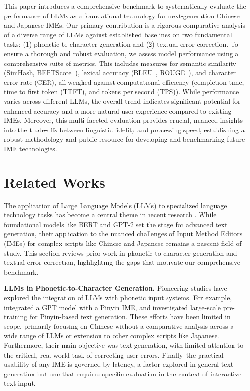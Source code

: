\documentclass[10pt, a4paper]{article}
\begin{document}
This paper introduces a comprehensive benchmark to systematically evaluate the performance of LLMs as a foundational technology for next-generation Chinese and Japanese IMEs. Our primary contribution is a rigorous comparative analysis of a diverse range of LLMs against established baselines on two fundamental tasks: (1) phonetic-to-character generation and (2) textual error correction. To ensure a thorough and robust evaluation, we assess model performance using a comprehensive suite of metrics. This includes measures for semantic similarity (SimHash, BERTScore~\citep{zhang2019bertscore}), lexical accuracy (BLEU~\citep{papineni2002bleu}, ROUGE~\citep{lin2004rouge}), and character error rate (CER), all weighed against computational efficiency (completion time, time to first token (TTFT), and tokens per second (TPS)). While performance varies across different LLMs, the overall trend indicates significant potential for enhanced accuracy and a more natural user experience compared to existing IMEs. Moreover, this multi-faceted evaluation provides crucial, nuanced insights into the trade-offs between linguistic fidelity and processing speed, establishing a robust methodology and public resource for developing and benchmarking future IME technologies.


\section{Related Works}

The application of Large Language Models (LLMs) to specialized language technology tasks has become a central theme in recent research \citep{bommasani2021opportunities, zhao2023survey}. While foundational models like BERT \citep{devlin2018bert} and GPT-2 \citep{radford2019language} set the stage for advanced text generation, their application to the nuanced challenges of Input Method Editors (IMEs) for complex scripts like Chinese and Japanese remains a nascent field of study. This section reviews prior work in phonetic-to-character generation and textual error correction, highlighting the gaps that motivate our comprehensive benchmark.

\textbf{LLMs in Phonetic-to-Character Generation.}
Pioneering studies have explored the integration of LLMs with phonetic input systems. For example, \citet{sun2021chinesebert} integrated a GPT model with a Pinyin IME, and \citet{tan2022exploring} investigated large-scale pre-training for Pinyin-based text generation. These efforts have been limited in scope, primarily focusing on Chinese without a comparative analysis across a wide range of LLMs or extension to other complex scripts like Japanese. Furthermore, their main objective was text generation, with limited attention to the critical, real-world task of correcting user errors. Finally, the practical usability of any IME is governed by latency, a factor explored in general text generation \citep{stahlberg2020neural, brown2020language} but one that requires specific evaluation in the context of interactive text input.
\end{document}
